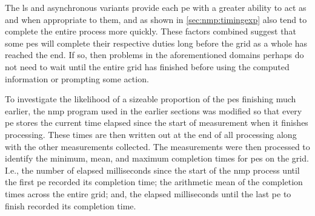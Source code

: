 The \gls{ls} and asynchronous variants provide each \gls{pe} with a greater ability to act as and when appropriate to them, and as shown in \autoref{sec:nmp:timingexp} also tend to complete the entire process more quickly.  These factors combined suggest that some \glspl{pe} will complete their respective duties long before the grid as a whole has reached the end.  If so, then problems in the aforementioned domains perhaps do not need to wait until the entire grid has finished before using the computed information or prompting some action.

To investigate the likelihood of a sizeable proportion of the \glspl{pe} finishing much earlier, the \gls{nmp} program used in the earlier sections was modified so that every \gls{pe} stores the current time elapsed since the start of measurement when it finishes processing.  These times are then written out at the end of all processing along with the other measurements collected.  The measurements were then processed to identify the minimum, mean, and maximum completion times for \glspl{pe} on the grid.  I.e., the number of elapsed milliseconds since the start of the \gls{nmp} process until the first \gls{pe} recorded its completion time; the arithmetic mean of the completion times across the entire grid; and, the elapsed milliseconds until the last \gls{pe} to finish recorded its completion time.

